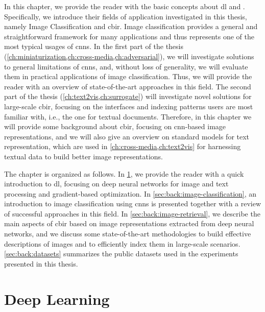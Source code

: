 In this chapter, we provide the reader with the basic concepts about \acrlong{dl} and .
Specifically, we introduce their fields of application investigated in this thesis, namely Image Classification and \gls{cbir}.
Image classification provides a general and straightforward framework for many applications and thus represents one of the most typical usages of \glspl{cnn}.
In the first part of the thesis (\ref{ch:miniaturization,ch:cross-media,ch:adversarial}), we will investigate solutions to general limitations of \glspl{cnn}, and, without loss of generality, we will evaluate them in practical applications of image classification.
Thus, we will provide the reader with an overview of state-of-the-art approaches in this field.
The second part of the thesis (\ref{ch:text2vis,ch:surrogate}) will investigate novel solutions for large-scale \gls{cbir}, focusing on the interfaces and indexing patterns users are most familiar with, i.e., the one for textual documents.
Therefore, in this chapter we will provide some background about \gls{cbir}, focusing on \gls{cnn}-based image representations, and we will also give an overview on standard models for text representation, which are used in \ref{ch:cross-media,ch:text2vis} for harnessing textual data to build better image representations.

The chapter is organized as follows.
In \ref{sec:back:deep-learning}, we provide the reader with a quick introduction to \acrlong{dl}, focusing on deep neural networks for image and text processing and gradient-based optimization.
In \ref{sec:back:image-classification}, an introduction to image classification using \glspl{cnn} is presented together with a review of successful approaches in this field.
In \ref{sec:back:image-retrieval}, we describe the main aspects of \gls{cbir} based on image representations extracted from deep neural networks, and we discuss some state-of-the-art methodologies to build effective descriptions of images and to efficiently index them in large-scale scenarios.
\ref{sec:back:datasets} summarizes the public datasets used in the experiments presented in this thesis.


\section{Deep Learning}
\label{sec:back:deep-learning}

